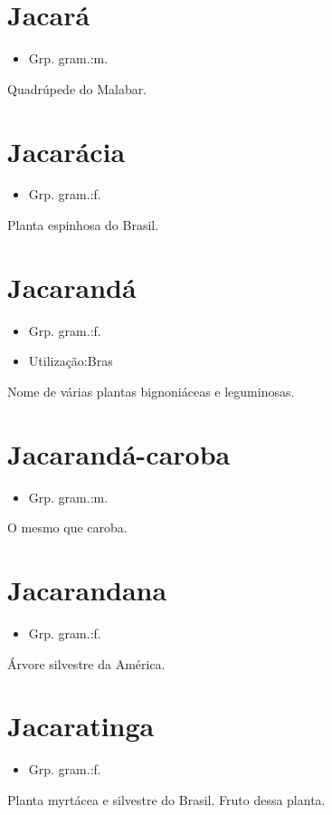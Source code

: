 \documentclass{article}
\begin{document}
\section{Jacará}
\begin{itemize}
\item {Grp. gram.:m.}
\end{itemize}
Quadrúpede do Malabar.
\section{Jacarácia}
\begin{itemize}
\item {Grp. gram.:f.}
\end{itemize}
Planta espinhosa do Brasil.
\section{Jacarandá}
\begin{itemize}
\item {Grp. gram.:f.}
\end{itemize}
\begin{itemize}
\item {Utilização:Bras}
\end{itemize}
Nome de várias plantas bignoniáceas e leguminosas.
\section{Jacarandá-caroba}
\begin{itemize}
\item {Grp. gram.:m.}
\end{itemize}
O mesmo que \textunderscore caroba\textunderscore .
\section{Jacarandana}
\begin{itemize}
\item {Grp. gram.:f.}
\end{itemize}
Árvore silvestre da América.
\section{Jacaratinga}
\begin{itemize}
\item {Grp. gram.:f.}
\end{itemize}
Planta myrtácea e silvestre do Brasil.
Fruto dessa planta.
\end{document}
